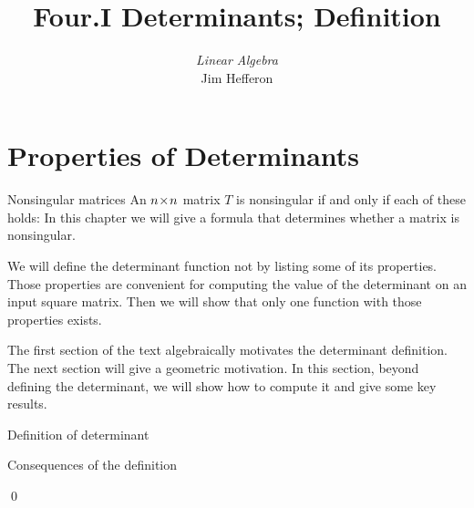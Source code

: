 \documentclass[10pt,t,serif,professionalfont]{beamer}
\title[Determinants] %
{Four.I Determinants; Definition}
\author{\textit{Linear Algebra} \\ {\small Jim Hef{}feron}}
\institute{
  \texttt{http://joshua.smcvt.edu/linearalgebra}
}
\date{}
\begin{document}
\begin{frame}
  \titlepage
\end{frame}




\section{Properties of Determinants}
\begin{frame}{Nonsingular matrices}
An \( n \! \times \! n \) matrix \( T \) is nonsingular if and only if
each of these holds:%
In this chapter we will give a formula that determines whether a
matrix is nonsingular.
\end{frame}




\begin{frame}
\end{frame}




\begin{frame}
We will define the determinant function not by listing 
some of its properties.
Those properties are convenient for computing the value of the determinant
on an input square matrix. 
Then we will show that only one function with those properties exists.

\pause
\medskip
\no
The first section of the text algebraically motivates the 
determinant definition. 
The next section will give a geometric motivation.
In this section, beyond defining the determinant, 
we will show how to compute it
and give some key results.
\end{frame}




\begin{frame}{Definition of determinant}

\pause 
{} 
\end{frame}




\begin{frame}{Consequences of the definition}
\lm[le:IdenRowsDetZero]

\pause 
\pf 
{}

\pause
{}
\end{frame}
\begin{frame}

\pause
{}  
\end{frame}
\begin{frame}
\qed
\end{frame}
\end{document}
